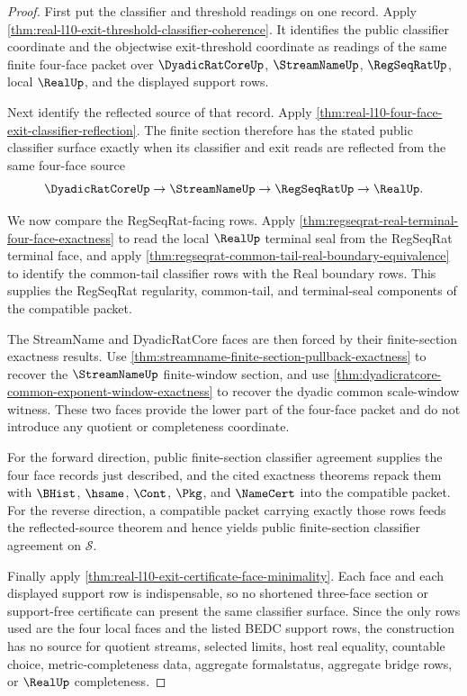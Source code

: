 \begin{proof}
First put the classifier and threshold readings on one record. Apply \autoref{thm:real-l10-exit-threshold-classifier-coherence}. It identifies the public classifier coordinate and the objectwise exit-threshold coordinate as readings of the same finite four-face packet over $\DyadicRatCoreUp$, $\StreamNameUp$, $\RegSeqRatUp$, local $\RealUp$, and the displayed support rows.

Next identify the reflected source of that record. Apply \autoref{thm:real-l10-four-face-exit-classifier-reflection}. The finite section therefore has the stated public classifier surface exactly when its classifier and exit reads are reflected from the same four-face source
$$
\DyadicRatCoreUp \to \StreamNameUp \to \RegSeqRatUp \to \RealUp.
$$

We now compare the RegSeqRat-facing rows. Apply \autoref{thm:regseqrat-real-terminal-four-face-exactness} to read the local $\RealUp$ terminal seal from the RegSeqRat terminal face, and apply \autoref{thm:regseqrat-common-tail-real-boundary-equivalence} to identify the common-tail classifier rows with the Real boundary rows. This supplies the RegSeqRat regularity, common-tail, and terminal-seal components of the compatible packet.

The StreamName and DyadicRatCore faces are then forced by their finite-section exactness results. Use \autoref{thm:streamname-finite-section-pullback-exactness} to recover the $\StreamNameUp$ finite-window section, and use \autoref{thm:dyadicratcore-common-exponent-window-exactness} to recover the dyadic common scale-window witness. These two faces provide the lower part of the four-face packet and do not introduce any quotient or completeness coordinate.

For the forward direction, public finite-section classifier agreement supplies the four face records just described, and the cited exactness theorems repack them with $\BHist$, $\hsame$, $\Cont$, $\Pkg$, and $\NameCert$ into the compatible packet. For the reverse direction, a compatible packet carrying exactly those rows feeds the reflected-source theorem and hence yields public finite-section classifier agreement on $\mathcal S$.

Finally apply \autoref{thm:real-l10-exit-certificate-face-minimality}. Each face and each displayed support row is indispensable, so no shortened three-face section or support-free certificate can present the same classifier surface. Since the only rows used are the four local faces and the listed BEDC support rows, the construction has no source for quotient streams, selected limits, host real equality, countable choice, metric-completeness data, aggregate formalstatus, aggregate bridge rows, or $\RealUp$ completeness.
\end{proof}

